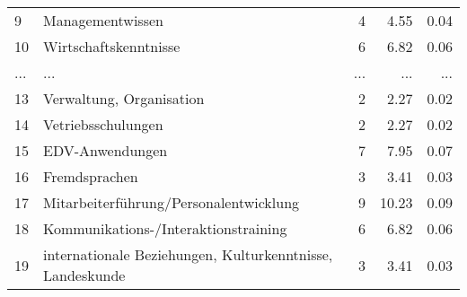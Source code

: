 \begin{longtable}{lXrrr}
        9 & \multicolumn{1}{X}{Managementwissen} & %
          \num{4} &
          \num[round-mode=places,round-precision=2]{4.55} &
          \num[round-mode=places,round-precision=2]{0.04} \\
        10 & \multicolumn{1}{X}{Wirtschaftskenntnisse} & %
          \num{6} &
          \num[round-mode=places,round-precision=2]{6.82} &
          \num[round-mode=places,round-precision=2]{0.06} \\
       ... & ... & ... & ... & ... \\
        13 & \multicolumn{1}{X}{Verwaltung, Organisation} & %
          \num{2} &
          \num[round-mode=places,round-precision=2]{2.27} &
          \num[round-mode=places,round-precision=2]{0.02} \\

        14 & \multicolumn{1}{X}{Vetriebsschulungen} & %
          \num{2} &
          \num[round-mode=places,round-precision=2]{2.27} &
          \num[round-mode=places,round-precision=2]{0.02} \\

        15 & \multicolumn{1}{X}{EDV-Anwendungen} & %
          \num{7} &
          \num[round-mode=places,round-precision=2]{7.95} &
          \num[round-mode=places,round-precision=2]{0.07} \\

        16 & \multicolumn{1}{X}{Fremdsprachen} & %
          \num{3} &
          \num[round-mode=places,round-precision=2]{3.41} &
          \num[round-mode=places,round-precision=2]{0.03} \\

        17 & \multicolumn{1}{X}{Mitarbeiterführung/Personalentwicklung} & %
          \num{9} &
          \num[round-mode=places,round-precision=2]{10.23} &
          \num[round-mode=places,round-precision=2]{0.09} \\

        18 & \multicolumn{1}{X}{Kommunikations-/Interaktionstraining} & %
          \num{6} &
          \num[round-mode=places,round-precision=2]{6.82} &
          \num[round-mode=places,round-precision=2]{0.06} \\

        19 & \multicolumn{1}{X}{internationale Beziehungen, Kulturkenntnisse, Landeskunde} & %
          \num{3} &
          \num[round-mode=places,round-precision=2]{3.41} &
          \num[round-mode=places,round-precision=2]{0.03} \\


\end{longtable}
